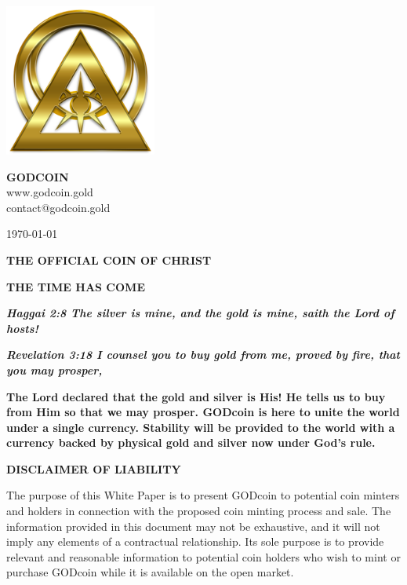\documentclass[12pt,a4paper]{article}
\begin{document}
  \begin{center}
    \includegraphics[width=50mm]{logo.png}\\
    \vspace{3mm}

    \Huge{\textbf{GODCOIN}}\\
    \vspace{3mm}
    \normalsize{www.godcoin.gold}\\
    \normalsize{contact@godcoin.gold}

    \normalsize{\today}

    \vspace{3mm}
    \LARGE{\textbf{THE OFFICIAL COIN OF CHRIST}}
    \vspace{3mm}

    \large{\textbf{THE TIME HAS COME}}
    \vspace{2mm}

    \normalsize{\color{Red}\textit{\textbf{Haggai 2:8 The silver is mine, and
    the gold is mine, saith the Lord of hosts!}}}

    \normalsize{\color{Red}\textit{\textbf{Revelation 3:18 I counsel you to buy
    gold from me, proved by fire, that you may prosper,}}}

    \vspace{5mm}

    \normalsize{\textbf{The Lord declared that the gold and silver is His! He
    tells us to buy from Him so that we may prosper. GODcoin is here to unite
    the world under a single currency. Stability will be provided to the world
    with a currency backed by physical gold and silver now under God's rule.}}

    \vspace{3mm}
  \end{center}

  \newpage
  \begin{center}
    \textbf{DISCLAIMER OF LIABILITY}
  \end{center}
  The purpose of this White Paper is to present GODcoin to potential coin minters and holders in connection with the proposed coin minting process and sale. The information provided in this document may not be exhaustive, and it will not imply any elements of a contractual relationship. Its sole purpose is to provide relevant and reasonable information to potential coin holders who wish to mint or purchase GODcoin while it is available on the open market.\\
\end{document}
